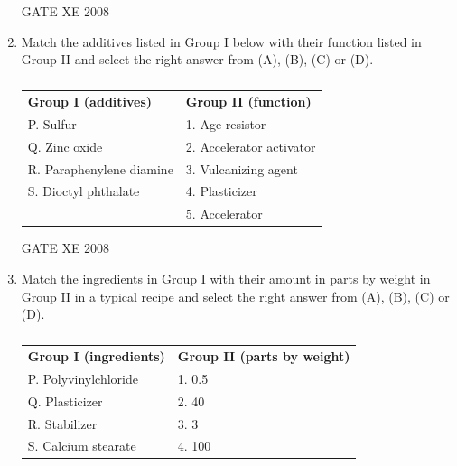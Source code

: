 \documentclass[12pt]{article}
\begin{document}
\begin{enumerate}
GATE XE 2008

\item Match the additives listed in Group I below with their function listed in Group II and select the right answer from (A), (B), (C) or (D).

\begin{table}[H]     \centering     \caption{}     \label{}     \begin{tabular}{l l}
\textbf{Group I (additives)} & \textbf{Group II (function)} \\
P. Sulfur & 1. Age resistor \\
Q. Zinc oxide & 2. Accelerator activator \\
R. Paraphenylene diamine & 3. Vulcanizing agent \\
S. Dioctyl phthalate & 4. Plasticizer \\
& 5. Accelerator \\
\end{tabular} \end{table}

\begin{enumerate}
\end{enumerate}

GATE XE 2008

\item Match the ingredients in Group I with their amount in parts by weight in Group II in a typical recipe and select the right answer from (A), (B), (C) or (D).

\begin{table}[H]     \centering     \caption{}     \label{}     \begin{tabular}{l l}
\textbf{Group I (ingredients)} & \textbf{Group II (parts by weight)} \\
P. Polyvinylchloride & 1. 0.5 \\
Q. Plasticizer & 2. 40 \\
R. Stabilizer & 3. 3 \\
S. Calcium stearate & 4. 100 \\
\end{tabular} \end{table}


\end{enumerate}
\end{document}
